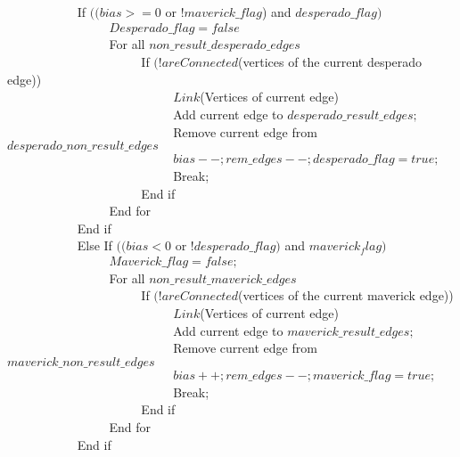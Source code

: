 \documentclass[12pt]{article}
\begin{document}
\begin{enumerate}
\verb|		|\verb|		|If $((bias >= 0$ or $!maverick\_flag$) and $desperado\_flag)$\\
\verb|		|\verb|		|\verb|		|$Desperado\_flag = false$\\
\verb|		|\verb|		|\verb|		|For all $non\_result\_desperado\_edges$\\
\verb|		|\verb|		|\verb|		|\verb|		|If $(!areConnected$(vertices of the current desperado edge))\\
\verb|		|\verb|		|\verb|		|\verb|		|\verb|		|$Link$(Vertices of current edge)\\
\verb|		|\verb|		|\verb|		|\verb|		|\verb|		|Add current edge to $desperado\_result\_edges;$\\
\verb|		|\verb|		|\verb|		|\verb|		|\verb|		|Remove current edge from $desperado\_non\_result\_edges$\\
\verb|		|\verb|		|\verb|		|\verb|		|\verb|		|$bias--; rem\_edges--; desperado\_flag = true;$\\
\verb|		|\verb|		|\verb|		|\verb|		|\verb|		|Break;\\
\verb|		|\verb|		|\verb|		|\verb|		|End if\\
\verb|		|\verb|		|\verb|		|End for\\
\verb|		|\verb|		|End if\\
\verb|		|\verb|		|Else If $((bias < 0$ or $!desperado\_flag)$ and $maverick_flag)$\\
\verb|		|\verb|		|\verb|		|$Maverick\_flag = false;$\\
\verb|		|\verb|		|\verb|		|For all $non\_result\_maverick\_edges$\\
\verb|		|\verb|		|\verb|		|\verb|		|If $(!areConnected$(vertices of the current maverick edge))\\
\verb|		|\verb|		|\verb|		|\verb|		|\verb|		|$Link$(Vertices of current edge)\\
\verb|		|\verb|		|\verb|		|\verb|		|\verb|		|Add current edge to $maverick\_result\_edges;$\\
\verb|		|\verb|		|\verb|		|\verb|		|\verb|		|Remove current edge from $maverick\_non\_result\_edges$\\
\verb|		|\verb|		|\verb|		|\verb|		|\verb|		|$bias++; rem\_edges--; maverick\_flag = true;$\\
\verb|		|\verb|		|\verb|		|\verb|		|\verb|		|Break;\\
\verb|		|\verb|		|\verb|		|\verb|		|End if\\
\verb|		|\verb|		|\verb|		|End for\\
\verb|		|\verb|		|End if\\

\end{enumerate}
\end{document}
